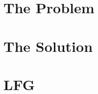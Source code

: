 \documentclass[aspectratio=169]{beamer}
\begin{document}
	
	\section{The Problem}
	
	\section{The Solution}
	
	
	\section{LFG}
	
\end{document}
